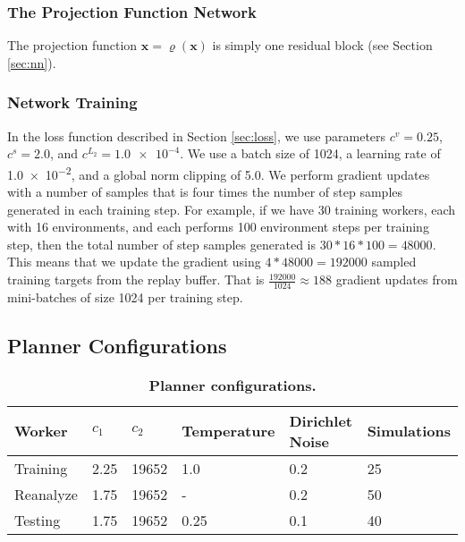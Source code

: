 \subsubsection{The Projection Function Network}
The projection function $\mathbf{x} = \varrho(\mathbf{x})$ is simply one residual block (see Section \ref{sec:nn}).


\subsubsection{Network Training}
In the loss function described in Section \ref{sec:loss}, we use parameters $c^v = 0.25$, $c^s = 2.0$, and $c^{L_2} = \num{1.0e-4}$.
We use a batch size of 1024, a learning rate of \num{1.0e-2}, and a global norm clipping of \num{5.0}.
We perform gradient updates with a number of samples that is four times the number of step samples generated in each training step.
For example, if we have 30 training workers, each with 16 environments, and each performs 100 environment steps per training step, then the total number of step samples generated is $30 * 16 * 100 = 48000$.
This means that we update the gradient using $4 * 48000 = 192000$ sampled training targets from the replay buffer.
That is $\frac{192000}{1024} \approx 188$ gradient updates from mini-batches of size 1024 per training step.

\subsection{Planner Configurations} \label{sec:planner_config}
\begin{table}
    \begin{tabular}{@{}|l|l|l|l|l|l|@{}}
        \toprule
        Worker    & $c_1$ & $c_2$ & Temperature & Dirichlet Noise & Simulations \\ \midrule
        Training  & 2.25  & 19652 & 1.0         & 0.2             & 25          \\ \midrule
        Reanalyze & 1.75  & 19652 & -           & 0.2             & 50          \\ \midrule
        Testing   & 1.75  & 19652 & 0.25        & 0.1             & 40          \\ \bottomrule
    \end{tabular}
    \captionsetup{width=\linewidth, justification=raggedright}
    \caption[Planner Configuration]{\textbf{Planner configurations.}}
    \label{tb:planner_args}
\end{table}

